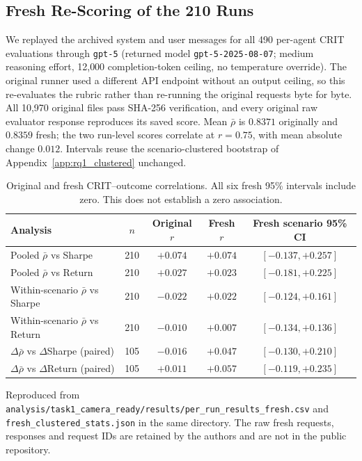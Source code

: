 \documentclass{article}
\begin{document}
\subsection{Fresh Re-Scoring of the 210 Runs}
\label{app:rq1_fresh}

We replayed the archived system and user messages for all 490 per-agent CRIT evaluations through \texttt{gpt-5} (returned model \texttt{gpt-5-2025-08-07}; medium reasoning effort, 12{,}000 completion-token ceiling, no temperature override). The original runner used a different API endpoint without an output ceiling, so this re-evaluates the rubric rather than re-running the original requests byte for byte. All 10{,}970 original files pass SHA-256 verification, and every original raw evaluator response reproduces its saved score. Mean $\bar{\rho}$ is $0.8371$ originally and $0.8359$ fresh; the two run-level scores correlate at $r{=}0.75$, with mean absolute change $0.012$. Intervals reuse the scenario-clustered bootstrap of Appendix~\ref{app:rq1_clustered} unchanged.

\begin{table}[H]
\centering\small
\begin{tabular}{lcccc}
\toprule
Analysis & $n$ & Original $r$ & Fresh $r$ & Fresh scenario 95\% CI \\
\midrule
Pooled $\bar{\rho}$ vs Sharpe & 210 & $+0.074$ & $+0.074$ & $[-0.137,+0.257]$ \\
Pooled $\bar{\rho}$ vs Return & 210 & $+0.027$ & $+0.023$ & $[-0.181,+0.225]$ \\
Within-scenario $\bar{\rho}$ vs Sharpe & 210 & $-0.022$ & $+0.022$ & $[-0.124,+0.161]$ \\
Within-scenario $\bar{\rho}$ vs Return & 210 & $-0.010$ & $+0.007$ & $[-0.134,+0.136]$ \\
$\Delta\bar{\rho}$ vs $\Delta$Sharpe (paired) & 105 & $-0.016$ & $+0.047$ & $[-0.130,+0.210]$ \\
$\Delta\bar{\rho}$ vs $\Delta$Return (paired) & 105 & $+0.011$ & $+0.057$ & $[-0.119,+0.235]$ \\
\bottomrule
\end{tabular}
\vspace{4pt}
\caption{Original and fresh CRIT--outcome correlations. All six fresh 95\% intervals include zero. This does not establish a zero association.}
\label{tab:rq1_fresh}
\end{table}

Reproduced from \texttt{analysis/task1\_camera\_ready/results/per\_run\_results\_fresh.csv} and \texttt{fresh\_clustered\_stats.json} in the same directory. The raw fresh requests, responses and request IDs are retained by the authors and are not in the public repository.
\end{document}

